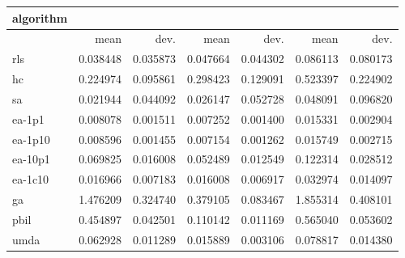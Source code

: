 \begin{tabular}{@{}l*{6}{>{{}}N{1}{2}}@{}}
\toprule
{algorithm} &  &  &  \\
\midrule
& {mean} & {dev.} & {mean} & {dev.} & {mean} & {dev.} \\
\midrule
rls & 0.038448 & 0.035873 & 0.047664 & 0.044302 & 0.086113 & 0.080173 \\
 hc & 0.224974 & 0.095861 & 0.298423 & 0.129091 & 0.523397 & 0.224902 \\
 sa & 0.021944 & 0.044092 & 0.026147 & 0.052728 & 0.048091 & 0.096820 \\
 ea-1p1 & 0.008078 & 0.001511 & 0.007252 & 0.001400 & 0.015331 & 0.002904 \\
 ea-1p10 & 0.008596 & 0.001455 & 0.007154 & 0.001262 & 0.015749 & 0.002715 \\
 ea-10p1 & 0.069825 & 0.016008 & 0.052489 & 0.012549 & 0.122314 & 0.028512 \\
 ea-1c10 & 0.016966 & 0.007183 & 0.016008 & 0.006917 & 0.032974 & 0.014097 \\
 ga & 1.476209 & 0.324740 & 0.379105 & 0.083467 & 1.855314 & 0.408101 \\
 pbil & 0.454897 & 0.042501 & 0.110142 & 0.011169 & 0.565040 & 0.053602 \\
 umda & 0.062928 & 0.011289 & 0.015889 & 0.003106 & 0.078817 & 0.014380 \\
 \bottomrule
\end{tabular}
